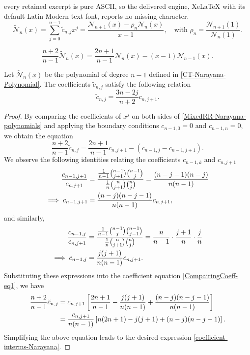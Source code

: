 \documentclass[10pt,a4paper]{amsart}
\begin{document}
every retained excerpt is pure ASCII, so the delivered engine, XeLaTeX with its default Latin Modern text font, reports no missing character.
\begin{equation}\label{CT-Narayana-Polynomial}
	\tilde{\mathcal{N}}_n(x) = \sum_{j=0}^{n-1} \tilde{c}_{n,j} x^j= \frac{\mathcal{N}_{n+1}(x) - \rho_n \mathcal{N}_n(x)}{x - 1}, \quad \text{with } \rho_n = \frac{\mathcal{N}_{n+1}(1)}{\mathcal{N}_n(1)}.
\end{equation}

	\begin{equation}\label{MixedRR-Narayana-polynomials}
		\frac{n+2}{n-1}\tilde{\mathcal{N}}_n(x) = \frac{2n+1}{n-1}\mathcal{N}_n(x) - (x-1)\mathcal{N}_{n-1}(x).
	\end{equation}

\begin{proposition}
	Let $\tilde{\mathcal{N}}_n(x)$ be the polynomial of degree $n-1$ defined in \eqref{CT-Narayana-Polynomial}. The coefficients $\tilde{c}_{n,j}$ satisfy the following relation
	\begin{equation}\label{coefficient-interms-Narayana}
		\tilde{c}_{n,j} = \frac{3n - 2j}{n + 2} c_{n, j+1}.
	\end{equation}
\end{proposition}

\begin{proof}
	By comparing the coefficients of $x^j$ on both sides of \eqref{MixedRR-Narayana-polynomials} and applying the boundary conditions $c_{n-1,0}=0$ and $c_{n-1,n}=0$, we obtain the equation
	\begin{equation}\label{CompairingCoeff-eq1}
		\frac{n+2}{n-1} \tilde{c}_{n,j} = \frac{2n+1}{n-1} c_{n,j+1} - (c_{n-1, j} - c_{n-1, j+1}).
	\end{equation}
	We observe the following identities relating the coefficients $c_{n-1,k}$ and $c_{n, j+1}$
	\begin{align}
		\frac{c_{n-1,j+1}}{c_{n,j+1}} &= \frac{\frac{1}{n-1}\binom{n-1}{j+1}\binom{n-1}{j}}{\frac{1}{n}\binom{n}{j+1}\binom{n}{j}} = \frac{(n-j-1)(n-j)}{n(n-1)}  \notag \\
		\implies c_{n-1, j+1} &= \frac{(n-j)(n-j-1)}{n(n-1)} c_{n,j+1},
	\end{align}
	and similarly,
	\begin{align}
		\frac{c_{n-1,j}}{c_{n,j+1}} &= \frac{\frac{1}{n-1}\binom{n-1}{j}\binom{n-1}{j-1}}{\frac{1}{n}\binom{n}{j+1}\binom{n}{j}} = \frac{n}{n-1} \cdot \frac{j+1}{n} \cdot \frac{j}{n} \notag \\
		\implies c_{n-1, j} &= \frac{j(j+1)}{n(n-1)} c_{n,j+1}.
	\end{align}
	Substituting these expressions into the coefficient equation \eqref{CompairingCoeff-eq1}, we have
	\begin{align*}
		\frac{n+2}{n-1} \tilde{c}_{n,j} &= c_{n,j+1} \left[ \frac{2n+1}{n-1} - \frac{j(j+1)}{n(n-1)} + \frac{(n-j)(n-j-1)}{n(n-1)} \right] \notag \\
		&= \frac{c_{n,j+1}}{n(n-1)} \left[ n(2n+1) - j(j+1) + (n-j)(n-j-1) \right].
	\end{align*}
	Simplifying the  above equation  leads to the desired expression \eqref{coefficient-interms-Narayana}.
\end{proof}
\end{document}
